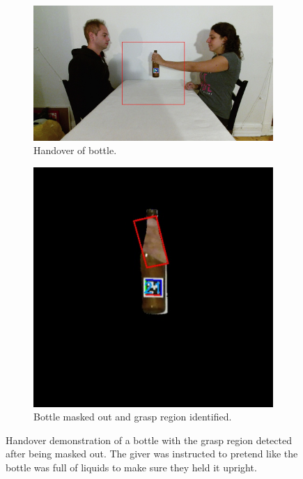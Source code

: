 \begin{figure}
	\centering
	\begin{subfigure}[t]{\textwidth}
		\centering
		\includegraphics[width=\textwidth]{img/methods/handovers/bottle_frame.jpg}
		\caption{Handover of bottle.}
		\label{fig:demo_handover_bottle}
	\end{subfigure}
	\par\bigskip
	\begin{subfigure}[t]{0.5\textwidth}
		\centering
		\includegraphics[width=\textwidth]{img/methods/handovers/bottle_masked.jpg}
		\caption{Bottle masked out and grasp region identified.}
		\label{fig:handover_bottle_masked}
	\end{subfigure}
	\caption{Handover demonstration of a bottle with the grasp region detected after being masked out. The giver was instructed to pretend like the bottle was full of liquids to make sure they held it upright.}
	\label{fig:handover_bottle}
\end{figure}

